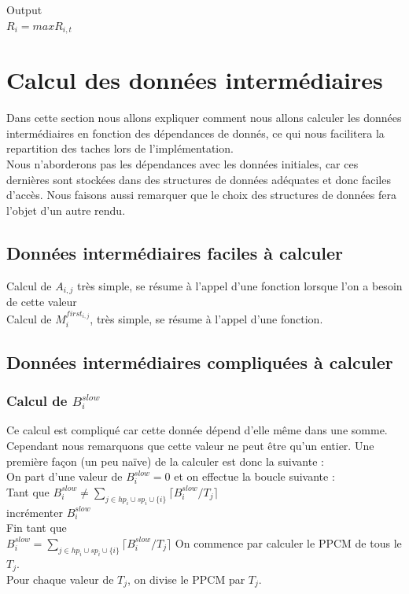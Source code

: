 \documentclass[10pt,a4paper]{article}
\begin{document}
Output\\
$R_{i} = max R_{i,t}$\\



\section{Calcul des données intermédiaires}
Dans cette section nous allons expliquer comment nous allons calculer les données 
intermédiaires en fonction des dépendances de donnés, ce qui nous facilitera la repartition 
des taches lors de l'implémentation.\\
Nous n'aborderons pas les dépendances avec les données initiales, car ces dernières sont stockées 
dans des structures de données adéquates et donc faciles d'accès.
Nous faisons aussi remarquer que le choix des structures de données fera 
l'objet d'un autre rendu.

\subsection{Données intermédiaires faciles à calculer}
Calcul de $A_{i,j}$ très simple, se résume à l'appel d'une fonction lorsque l'on a besoin de 
cette valeur\\
Calcul de $M_{i}^{first_{i,j}}$, très simple, se résume à l'appel d'une fonction.

\subsection{Données intermédiaires compliquées à calculer}

\subsubsection{Calcul de $B_i^{slow}$}
Ce calcul est compliqué car cette donnée dépend d'elle même dans une somme. Cependant 
nous remarquons que cette valeur ne peut être qu'un entier. Une première façon (un peu naïve) 
de la calculer est donc la suivante :\\
\linebreak
On part d'une valeur de $B_i^{slow} = 0$ et on effectue la boucle suivante :\\
Tant que $B_i^{slow} \neq \sum \limits _{j \in hp_i \cup sp_i \cup \{i\}} 
\lceil B_i^{slow}/T_ j\rceil$\\
\hspace{4em} incrémenter $B_i^{slow}$\\
Fin tant que\\
\linebreak
$B_i^{slow} = \sum \limits _{j \in hp_i \cup sp_i \cup \{i\}} 
\lceil B_i^{slow}/T_ j\rceil$
On commence par calculer le PPCM de tous le $T_j$.\\
Pour chaque valeur de $T_j$, on divise le PPCM par $T_j$.
\end{document}
